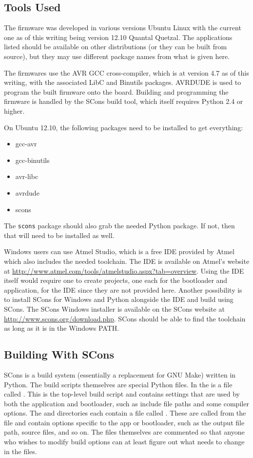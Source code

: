\documentclass{article}
\begin{document}
\subsection{Tools Used} \label{ssec:FWTools}
The firmware was developed in various versions Ubuntu Linux with the current one as of this writing
being version 12.10 Quantal Quetzal.  The applications listed should be available on other
distributions (or they can be built from source), but they may use different package names from what
is given here.

The firmwares use the AVR GCC cross-compiler, which is at version 4.7 as of this writing, with
the associated LibC and Binutils packages.  AVRDUDE is used to program the built firmware onto the
board.  Building and programming the firmware is handled by the SCons build tool, which itself
requires Python 2.4 or higher.

On Ubuntu 12.10, the following packages need to be installed to get everything:

\begin{itemize}
  \item gcc-avr
  \item gcc-binutils
  \item avr-libc
  \item avrdude
  \item scons
\end{itemize}

The \texttt{scons} package should also grab the needed Python package.  If not, then that will need to be
installed as well.

Windows users can use Atmel Studio, which is a free IDE provided by Atmel which also includes the
needed toolchain.  The IDE is available on Atmel's website at
\url{http://www.atmel.com/tools/atmelstudio.aspx?tab=overview}.  Using the IDE itself would require
one to create projects, one each for the bootloader and application, for the IDE since they are not
provided here.  Another possibility is to install SCons for Windows and Python alongside the IDE and
build using SCons.  The SCons Windows installer is available on the SCons website at
\url{http://www.scons.org/download.php}.  SCons should be able to find the toolchain as long as it
is in the Windows PATH.

\subsection{Building With SCons} \label{ssec:FWBuilding}
SCons is a build system (essentially a replacement for GNU Make) written in Python.  The build
scripts themselves are special Python files.  In the  is a file called
.  This is the top-level build script and contains settings that are used by both
the application and bootloader, such as include file paths and some compiler options.  The
 and  directories each contain a file called
.  These are called from the  file and contain options
specific to the app or bootloader, such as the output file path, source files, and so on.  The files
themselves are commented so that anyone who wishes to modify build options can at least figure out
what needs to change in the files.
\end{document}
